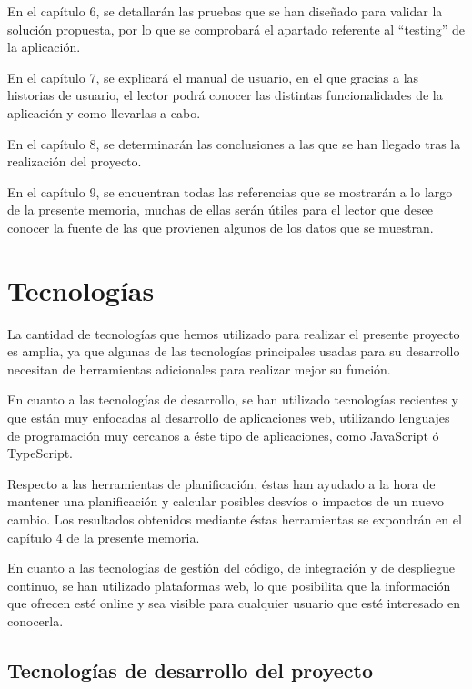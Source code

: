 \documentclass[11pt,openany]{book}
\begin{document}
En el capítulo 6, se detallarán las pruebas que se han diseñado para validar la solución propuesta, por lo que se comprobará el apartado referente al ``testing'' de la aplicación.

En el capítulo 7, se explicará el manual de usuario, en el que gracias a las historias de usuario, el lector podrá conocer las distintas funcionalidades de la aplicación y como llevarlas a cabo.

En el capítulo 8, se determinarán las conclusiones a las que se han llegado tras la realización del proyecto.

En el capítulo 9, se encuentran todas las referencias que se mostrarán a lo largo de la presente memoria, muchas de ellas serán útiles para el lector que desee conocer la fuente de las que provienen algunos de los datos que se muestran.


\chapter{Tecnologías}

La cantidad de tecnologías que hemos utilizado para realizar el presente proyecto es amplia, ya que algunas de las tecnologías principales usadas para su desarrollo necesitan de herramientas adicionales para realizar mejor su función.

En cuanto a las tecnologías de desarrollo, se han utilizado tecnologías recientes y que están muy enfocadas al desarrollo de aplicaciones web, utilizando lenguajes de programación muy cercanos a éste tipo de aplicaciones, como JavaScript ó TypeScript.

Respecto a las herramientas de planificación, éstas han ayudado a la hora de mantener una planificación y calcular posibles desvíos o impactos de un nuevo cambio. Los resultados obtenidos mediante éstas herramientas se expondrán en el capítulo 4 de la presente memoria.

En cuanto a las tecnologías de gestión del código, de integración y de despliegue continuo, se han utilizado plataformas web, lo que posibilita que la información que ofrecen esté online y sea visible para cualquier usuario que esté interesado en conocerla. 

\section{Tecnologías de desarrollo del proyecto}
\end{document}
